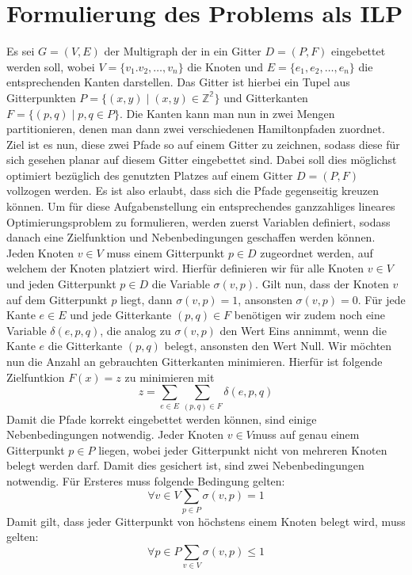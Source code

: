 \documentclass[bachelor, german]{algothesis}
\begin{document}
\section{Formulierung des Problems als ILP}
Es sei $G = (V,E)$ der Multigraph der in ein Gitter $D=(P,F)$ eingebettet werden soll, wobei $V=\{v_1.v_2,\dots, v_n\} $ die Knoten und $E=\{e_1, e_2, \dots, e_n\}$ die entsprechenden Kanten darstellen. Das Gitter ist hierbei ein Tupel aus Gitterpunkten $P=\{(x,y) \mid (x,y) \in \mathbb{Z^2} \}$ und Gitterkanten $F=\{(p,q) \mid p,q \in P\}$. Die Kanten kann man nun in zwei Mengen partitionieren, denen man dann zwei verschiedenen Hamiltonpfaden zuordnet. Ziel ist es nun, diese zwei Pfade so auf einem Gitter zu zeichnen, sodass diese für sich gesehen planar auf diesem Gitter eingebettet sind. Dabei soll dies möglichst optimiert bezüglich des genutzten Platzes auf einem Gitter $D=(P,F)$ vollzogen werden. Es ist also erlaubt, dass sich die Pfade gegenseitig kreuzen können. \newline
Um für diese Aufgabenstellung ein entsprechendes ganzzahliges lineares Optimierungsproblem zu formulieren, werden zuerst Variablen definiert, sodass danach eine Zielfunktion und Nebenbedingungen geschaffen werden können. \newline
Jeden Knoten $v \in V$ muss einem Gitterpunkt $p \in D$ zugeordnet werden, auf welchem der Knoten platziert wird. Hierfür definieren wir für alle Knoten $v \in V$ und jeden Gitterpunkt $p \in D$ die Variable $\sigma(v,p)$. Gilt nun, dass der Knoten $v$ auf dem Gitterpunkt $p$ liegt, dann $\sigma(v,p) = 1$, ansonsten $\sigma(v,p) = 0$.  \newline
Für jede Kante $e \in E$ und jede Gitterkante $(p,q) \in F$ benötigen wir zudem noch eine Variable $\delta(e,p,q)$, die analog zu $\sigma(v,p)$ den Wert Eins annimmt, wenn die Kante $e$ die Gitterkante $(p,q)$ belegt, ansonsten den Wert Null.\newline
Wir möchten nun die Anzahl an gebrauchten Gitterkanten minimieren. Hierfür ist folgende Zielfuntkion $F(x) = z$  zu minimieren mit $$z = \sum_{e \in E} \sum_{(p,q) \in F} \delta(e,p,q)$$
Damit die Pfade korrekt eingebettet werden können, sind einige Nebenbedingungen notwendig.
Jeder Knoten $v \in V$muss auf genau einem Gitterpunkt $p \in P$ liegen, wobei jeder Gitterpunkt nicht von mehreren Knoten belegt werden darf. Damit dies gesichert ist, sind zwei Nebenbedingungen notwendig. Für Ersteres muss folgende Bedingung gelten: $$ \forall v \in V \sum_{p \in P} \sigma(v,p) = 1$$ Damit gilt, dass jeder Gitterpunkt von höchstens einem Knoten belegt wird, muss gelten: $$\forall p \in P \sum_{v \in V} \sigma(v,p) \leq 1$$ 
\end{document}
